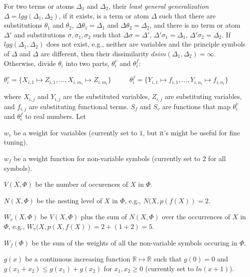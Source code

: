 \documentclass[EPiC]{easychair}
\newenvironment{packed_itemize}{
\vspace*{-0.5em}
\begin{itemize}
  \setlength{\partopsep}{0pt}
  \setlength{\itemsep}{1pt}
  \setlength{\parskip}{0pt}
  \setlength{\parsep}{0pt}
}{\end{itemize}}
\begin{document}
For two terms or atoms $\Delta_1$ and $\Delta_2$, their \emph{least general 
generalization} $\Delta = lgg(\Delta_1,\Delta_2)$, if it exists, is a term 
or atom $\Delta$ such that there are substitutions $\theta_1$ and $\theta_2$, 
$\Delta\theta_1 = \Delta_1$ and $\Delta\theta_2 = \Delta_2$, and 
there is no term or atom $\Delta'$ and substitutions 
$\sigma, \sigma_1, \sigma_2$ such that 
$\Delta\sigma = \Delta'$, $\Delta'\sigma_1 = \Delta_1$, 
$\Delta'\sigma_2 = \Delta_2$.
If $lgg(\Delta_1,\Delta_2)$ does not exist, e.g., neither are variables and 
the principle symbols of $\Delta$ and $\Delta$ are different, then their 
dissimilarity $dsim(\Delta_1,\Delta_2) = \infty$.
Otherwise, divide $\theta_i$ into two parts, $\theta_i^v$ and $\theta_i^f$:
\begin{center}
$\theta_i^v=\{X_{i,1}\mapsto Z_{i,1},\dots,X_{i,m_i}\mapsto Z_{i,m_i}\}$
~~~~
$\theta_i^f=\{Y_{i,1}\mapsto f_{i,1},\dots,Y_{i,n_i}\mapsto f_{i,n_i}\}$
\end{center}
where $X_{i,j}$ and $Y_{i,j}$ are the substituted variables, 
$Z_{i,j}$ are substituting variables, and
$f_{i,j}$ are substituting functional terms.
$S_f$ and $S_v$ are functions that map $\theta_i^v$ and 
$\theta_i^f$ to real numbers.
Let
\begin{packed_itemize}
\item $w_v$ be a weight for variables (currently set to $1$, but it's 
      might be useful for fine tuning).
\item $w_f$ be a weight function for non-variable symbols (currently
      set to $2$ for all symbols). 
\item $V(X,\Phi)$ be the number of occurences of $X$ in $\Phi$.
\item $N(X,\Phi)$ be the nesting level of $X$ in $\Phi$, e.g., 
      $N(X,p(f(X)) = 2$.
\item $W_v(X,\Phi)$ be $V(X,\Phi)$ plus the sum of $N(X,\Phi)$ over the 
      occurrences of $X$ in $\Phi$, e.g., 
      $W_v(X,p(X,f(X)) = 2 + (1+2) = 5$.
\item $W_f(\Phi)$ be the sum of the weights of all the non-variable symbols 
      occuring in $\Phi$.
\item $g(x)$ be a continuous increasing function 
      $\mathbb{R} \mapsto \mathbb{R}$ such that 
      $g(0)=0$
      and
      $g(x_1+x_2) \leq g(x_1)+ g(x_2)$ for $x_1, x_2\geq0$
      (currently set to $ln(x+1)$).
\end{packed_itemize}
\end{document}
